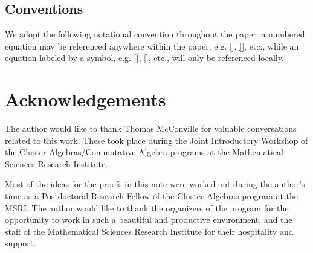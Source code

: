 \documentclass{amsart}
\begin{document}
 \subsection{Conventions}
  We adopt the following notational convention throughout the paper: a numbered equation may be referenced anywhere within the paper, e.g. \eqref{}, \eqref{}, etc., while an equation labeled by a symbol, e.g. \eqref{}, \eqref{}, etc., will only be referenced locally.
 
\section*{Acknowledgements}

The author would like to thank Thomas McConville for valuable conversations related to this work.  These took place during the Joint Introductory Workshop of the Cluster Algebras/Commutative Algebra programs at the Mathematical Sciences Research Institute.  

Most of the ideas for the proofs in this note were worked out during the author's time as a Postdoctoral Research Fellow of the Cluster Algebras program at the MSRI.  The author would like to thank the organizers of the program for the opportunity to work in such a beautiful and productive environment, and the staff of the Mathematical Sciences Research Institute for their hospitality and support. 
\end{document}
